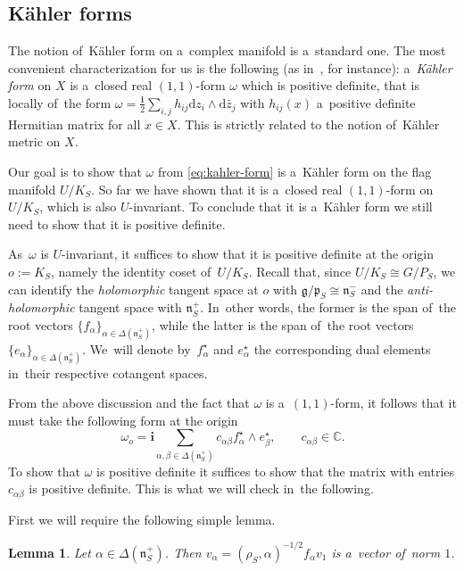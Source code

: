 \documentclass[10pt,a4paper]{amsart}
\numberwithin{equation}{section}
\newtheorem{Lemma}[Theorem]{Lemma}
\newcommand{\lieg}{\mathfrak{g}}
\newcommand{\lien}{\mathfrak{n}}
\newcommand{\liep}{\mathfrak{p}}
\newcommand{\bbC}{\mathbb{C}}
\newcommand{\iu}{\boldsymbol{i}}
\newcommand{\kafo}{\omega}
\newcommand{\homroot}{\Delta(\lien_S^+)}
\begin{document}
\subsection{K\"ahler forms}

The notion of~K\"ahler form on a~complex manifold is a~standard one.
The most convenient characterization for us is the following (as in~\cite[Lemma 3.1.7]{huybrechts}, for instance): a~\emph{K\"ahler form} on $X$ is a~closed real $(1, 1)$-form $\omega$ which is positive definite, that is locally of~the form $\omega = \frac{\iu}{2} \sum_{i, j} h_{i j} \mathrm{d} z_i \wedge \mathrm{d} \bar{z}_j$ with $h_{i j}(x)$ a~positive definite Hermitian matrix for all $x \in X$. This is strictly related to the notion of~K\"ahler metric on $X$.

Our goal is to show that $\kafo$ from \eqref{eq:kahler-form} is a~K\"ahler form on the flag manifold $U / K_S$.
So far we have shown that it is a~closed real $(1, 1)$-form on $U / K_S$, which is also $U$-invariant.
To conclude that it is a~K\"ahler form we still need to show that it is positive definite.

As~$\kafo$ is $U$-invariant, it suffices to show that it is positive definite at the origin $o := K_S$, namely the identity coset of~$U / K_S$.
Recall that, since $U / K_S \cong G / P_S$, we can identify the \emph{holomorphic} tangent space at $o$ with $\lieg / \liep_S \cong \lien_S^-$ and the \emph{anti-holomorphic} tangent space with $\lien_S^+$.
In~other words, the former is the span of~the root vectors $\{f_\alpha\}_{\alpha \in \homroot}$, while the latter is the span of~the root vectors $\{e_\alpha\}_{\alpha \in \homroot}$.
We~will denote by~$f_\alpha^\star$ and $e_\alpha^\star$ the corresponding dual elements in~their respective cotangent spaces.

From the above discussion and the fact that $\kafo$ is a~$(1, 1)$-form, it follows that it must take the following form at the origin
\[
\kafo_o = \iu \sum_{\alpha, \beta \in \homroot} c_{\alpha \beta} f_\alpha^\star \wedge e_\beta^\star, \qquad c_{\alpha \beta} \in \bbC.
\]
To show that $\kafo$ is positive definite it suffices to show that the matrix with entries $c_{\alpha \beta}$ is positive definite.
This is what we will check in~the following.

First we will require the following simple lemma.

\begin{Lemma}
Let $\alpha \in \homroot$. Then $v_\alpha = (\rho_S, \alpha)^{-1/2} f_\alpha v_1$ is a~vector of~norm $1$.
\end{Lemma}
\end{document}
